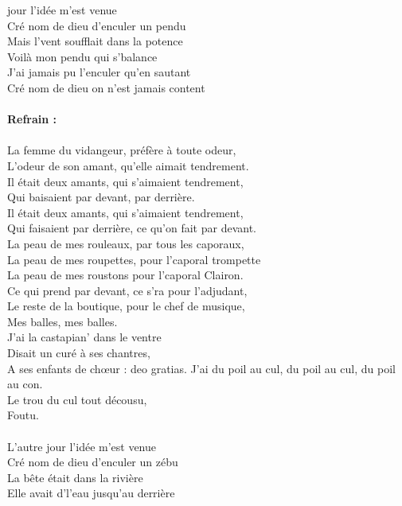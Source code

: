 
 jour l'idée m'est venue
\\Cré nom de dieu d'enculer un pendu
\\Mais l'vent soufflait dans la potence
\\Voilà mon pendu qui s'balance
\\J'ai jamais pu l'enculer qu'en sautant
\\Cré nom de dieu on n'est jamais content
\\\\\textbf{Refrain :}
\\\\La femme du vidangeur, préfère à toute odeur,
\\L'odeur de son amant, qu'elle aimait tendrement.
\\Il était deux amants, qui s'aimaient tendrement,
\\Qui baisaient par devant, par derrière.
\\Il était deux amants, qui s'aimaient tendrement,
\\Qui faisaient par derrière, ce qu'on fait par devant.
\\La peau de mes rouleaux, par tous les caporaux,
\\La peau de mes roupettes, pour l'caporal trompette
\\La peau de mes roustons pour l'caporal Clairon.
\\Ce qui prend par devant, ce s'ra pour l'adjudant,
\\Le reste de la boutique, pour le chef de musique,
\\Mes balles, mes balles.
\\J'ai la castapian' dans le ventre
\\Disait un curé à ses chantres,
\\A ses enfants de chœur : deo gratias.
{J'ai du poil au cul, du poil au cul, du poil au con.}
\\Le trou du cul tout décousu,
\\Foutu.
\\\\L'autre jour l'idée m'est venue
\\Cré nom de dieu d'enculer un zébu
\\La bête était dans la rivière
\\Elle avait d'l'eau jusqu'au derrière

